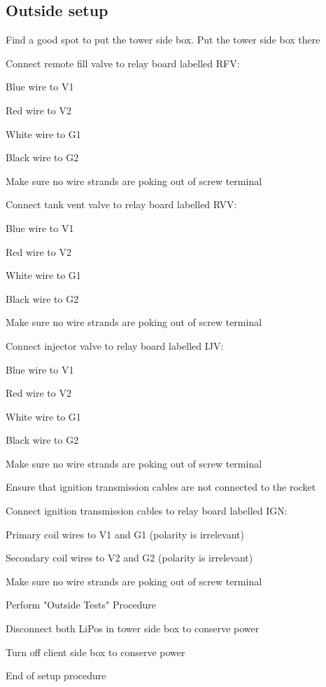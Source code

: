 \subsection{Outside setup}
\begin{checklist}
    \item Find a good spot to put the tower side box. Put the tower side box there
    \item Connect remote fill valve to relay board labelled RFV:
    \begin{checklist}
        \item Blue wire to V1
        \item Red wire to V2
        \item White wire to G1
        \item Black wire to G2
        \item Make sure no wire strands are poking out of screw terminal
    \end{checklist}
    \item Connect tank vent valve to relay board labelled RVV:
    \begin{checklist}
        \item Blue wire to V1
        \item Red wire to V2
        \item White wire to G1
        \item Black wire to G2
        \item Make sure no wire strands are poking out of screw terminal
    \end{checklist}
    \item Connect injector valve to relay board labelled IJV:
    \begin{checklist}
        \item Blue wire to V1
        \item Red wire to V2
        \item White wire to G1
        \item Black wire to G2
        \item Make sure no wire strands are poking out of screw terminal
    \end{checklist}
    \item Ensure that ignition transmission cables are not connected to the rocket
    \item Connect ignition transmission cables to relay board labelled IGN:
    \begin{checklist}
        \item Primary coil wires to V1 and G1 (polarity is irrelevant)
        \item Secondary coil wires to V2 and G2 (polarity is irrelevant)
        \item Make sure no wire strands are poking out of screw terminal
    \end{checklist}
    \item Perform "Outside Tests" Procedure
    \item Disconnect both LiPos in tower side box to conserve power
    \item Turn off client side box to conserve power
\end{checklist}
End of setup procedure


